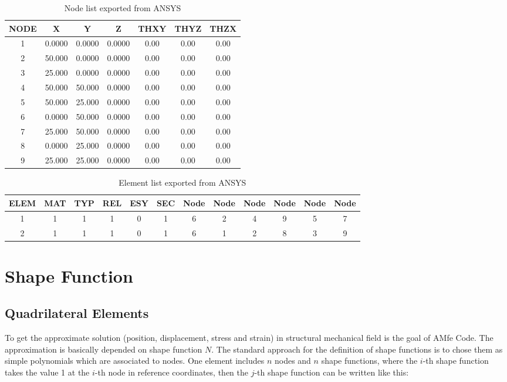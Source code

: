 \begin{table}
	\begin{center}
	\caption{Node list exported from ANSYS}\label{tab: node_list}
	\begin{tabular}{ ccccccc }
		\hline			
		NODE & X & Y & Z & THXY & THYZ & THZX\\ \hline
		1 & 0.0000 & 0.0000 & 0.0000 & 0.00 & 0.00 & 0.00 \\
		2 & 50.000 & 0.0000 & 0.0000 & 0.00 & 0.00 & 0.00 \\
		3 & 25.000 & 0.0000 & 0.0000 & 0.00 & 0.00 & 0.00 \\
		4 & 50.000 & 50.000 & 0.0000 & 0.00 & 0.00 & 0.00 \\
		5 & 50.000 & 25.000 & 0.0000 & 0.00 & 0.00 & 0.00 \\
		6 & 0.0000 & 50.000 & 0.0000 & 0.00 & 0.00 & 0.00 \\
		7 & 25.000 & 50.000 & 0.0000 & 0.00 & 0.00 & 0.00 \\
		8 & 0.0000 & 25.000 & 0.0000 & 0.00 & 0.00 & 0.00 \\
		9 & 25.000 & 25.000 & 0.0000 & 0.00 & 0.00 & 0.00 \\
		\hline  
	\end{tabular}	
		\end{center}
\end{table}

\begin{table}
	\begin{center}
	\caption{Element list exported from ANSYS}\label{tab: element_list}
	\begin{tabular}{ cccccccccccc }
		\hline			
		ELEM & MAT & TYP & REL & ESY & SEC & Node & Node  & Node & Node & Node & Node\\ \hline
		1 & 1 & 1 & 1 & 0 & 1 & 6 & 2 & 4 & 9 & 5 & 7 \\
		2 & 1 & 1 & 1 & 0 & 1 & 6 & 1 & 2 & 8 & 3 & 9 \\
		\hline  
	\end{tabular}		
		\end{center}	
\end{table}

\section{Shape Function}
\subsection{Quadrilateral Elements}
To get the approximate solution (position, displacement, stress and strain) in structural mechanical field is the goal of AMfe Code.  The approximation is basically depended on shape function $N$. The standard approach for the definition of shape functions is to chose them as simple polynomials which are associated to nodes. One element includes $n$ nodes and $n$ shape functions, where the $i$-th shape function takes the value 1 at the $i$-th node in reference coordinates, then the $j$-th shape function can be written like this: \\

